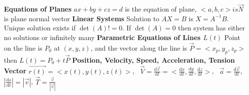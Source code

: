 \documentclass[twoside]{article}
\begin{document}
\textbf{Equations of Planes}\newline
\indent $ax+by+cz=d$ is the equation of plane, $<a,b,c> is \vec{N}$ is plane normal vector\newline
\textbf{Linear Systems}\newline
\indent Solution to $AX=B$ is $X=A^{-1}B$. Unique solution exists if $\det(A)!=0$. If $\det(A)=0$ then system has either no
\indent solutions or infinitely many\newline
\textbf{Parametric Equations of Lines $L(t)$}\newline
\indent Point on the line is $P_{0}$ at $(x,y,z)$, and the vector along the line is $\vec{P}=<x_p,y_p,z_p>$ then $L(t)=P_{0}+t\vec{P}$ \newline
\textbf{Position, Velocity, Speed, Acceleration, Tension Vector}\newline
\indent $\vec{r(t)}=<x(t),y(t),z(t)>$, \
$\vec{V}=\frac{\mathrm{d}\vec{r}}{\mathrm{d}t}=<\frac{\mathrm{d}x}{\mathrm{d}t},\frac{\mathrm{d}y}{\mathrm{d}t},\frac{\mathrm{d}z}{\mathrm{d}t}>$, \
$\vec{a}=\frac{\mathrm{d}\vec{v}}{\mathrm{d}t}$, \
$|\frac{\mathrm{d}s}{\mathrm{d}t}|=|\vec{v}|$,
$\vec{T}=\frac{\vec{v}}{|\vec{v}|}$
\end{document}
